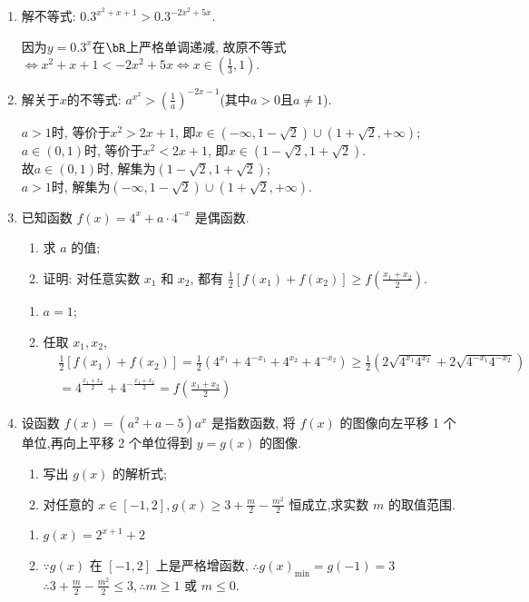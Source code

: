 \begin{enumerate}
\item 解不等式: $0.3^{x^2+x+1}>0.3^{-2x^2+5x}$. 
\begin{jieda}
因为$y=0.3^x$在$\bR$上严格单调递减, 故原不等式
$\iff x^2+x+1<-2x^2+5x\iff x\in(\frac{1}{3},1)$. 
\end{jieda}


\item 解关于$x$的不等式: $a^{x^2}>(\frac{1}{a})^{-2x-1}$(其中$a>0$且$a\neq 1$). 
\begin{jieda}
$a>1$时, 等价于$x^2>2x+1$, 即$x\in(-\infty,1-\sqrt{2})\cup(1+\sqrt{2},+\infty)$; \\
$a\in(0,1)$时, 等价于$x^2<2x+1$, 即$x\in(1-\sqrt{2},1+\sqrt{2})$. \\
故$a\in(0,1)$时, 解集为$(1-\sqrt{2},1+\sqrt{2})$; \\
$a>1$时, 解集为$(-\infty,1-\sqrt{2})\cup(1+\sqrt{2},+\infty)$. 
\end{jieda}


\item 已知函数 $f(x)=4^x+a \cdot 4^{-x}$ 是偶函数.
\begin{enumerate}
\item 求 $a$ 的值;
\item 证明: 对任意实数 $x_1$ 和 $x_2$, 都有 $\frac{1}{2}\left[f\left(x_1\right)+f\left(x_2\right)\right] \geq f\left(\frac{x_1+x_2}{2}\right)$.
\end{enumerate}

\begin{jieda}
\begin{enumerate}
\item $a=1$;
\item 任取 $x_1, x_2$,
$$
\begin{aligned}
& \frac{1}{2}\left[f\left(x_1\right)+f\left(x_2\right)\right]=\frac{1}{2}\left(4^{x_1}+4^{-x_1}+4^{x_2}+4^{-x_2}\right) \geq \frac{1}{2}\left(2 \sqrt{4^{x_1} 4^{x_2}}+2 \sqrt{4^{-x_1} 4^{-x_2}}\right) \\
& =4^{\frac{x_1+x_2}{2}}+4^{-\frac{x_1+x_2}{2}}=f\left(\frac{x_1+x_2}{2}\right)
\end{aligned}
$$
\end{enumerate}
\end{jieda}


\item 设函数 $f(x)=\left(a^2+a-5\right) a^x$ 是指数函数, 将 $f(x)$ 的图像向左平移 1 个单位,再向上平移 2 个单位得到 $y=g(x)$ 的图像.
\begin{enumerate}
    \item 写出 $g(x)$ 的解析式;
    \item 对任意的 $x \in[-1,2], g(x) \geq 3+\frac{m}{2}-\frac{m^2}{2}$ 恒成立,求实数 $m$ 的取值范围.
\end{enumerate}
\begin{jieda}
\begin{enumerate}
\item $g(x)=2^{x+1}+2$
\item $\because g(x)$ 在 $[-1,2]$ 上是严格增函数, $\therefore g(x)_{\min }=g(-1)=3$
$\therefore 3+\frac{m}{2}-\frac{m^2}{2} \leq 3, \therefore m \geq 1$ 或 $m \leq 0$.
\end{enumerate}
\end{jieda}


\end{enumerate}
